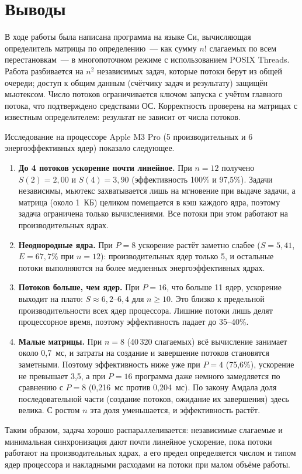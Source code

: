 \documentclass[pdf, unicode, 12pt, a4paper, oneside, fleqn]{article}
\begin{document}
\section{Выводы}

В ходе работы была написана программа на языке Си, вычисляющая определитель матрицы
по определению~--- как сумму $n!$ слагаемых по всем перестановкам~--- в многопоточном
режиме с использованием POSIX Threads. Работа разбивается на $n^2$ независимых задач,
которые потоки берут из общей очереди; доступ к общим данным (счётчику задач и результату)
защищён мьютексом. Число потоков ограничивается ключом запуска с учётом главного потока,
что подтверждено средствами ОС. Корректность проверена на матрицах с известным
определителем: результат не зависит от числа потоков.

Исследование на процессоре Apple M3 Pro (5 производительных и 6 энергоэффективных ядер)
показало следующее.

\begin{enumerate}
    \item \textbf{До 4 потоков ускорение почти линейное.} При $n = 12$ получено
          $S(2) = 2{,}00$ и $S(4) = 3{,}90$ (эффективность 100\% и 97,5\%). Задачи независимы,
          мьютекс захватывается лишь на мгновение при выдаче задачи, а матрица (около 1~КБ)
          целиком помещается в кэш каждого ядра, поэтому задача ограничена только
          вычислениями. Все потоки при этом работают на производительных ядрах.

    \item \textbf{Неоднородные ядра.} При $P = 8$ ускорение растёт заметно слабее
          ($S = 5{,}41$, $E = 67{,}7\%$ при $n = 12$): производительных ядер только 5,
          и остальные потоки выполняются на более медленных энергоэффективных ядрах.

    \item \textbf{Потоков больше, чем ядер.} При $P = 16$, что больше 11 ядер, ускорение
          выходит на плато: $S \approx 6{,}2$--$6{,}4$ для $n \ge 10$. Это близко к
          предельной производительности всех ядер процессора. Лишние потоки лишь делят
          процессорное время, поэтому эффективность падает до 35--40\%.

    \item \textbf{Малые матрицы.} При $n = 8$ (40\,320 слагаемых) всё вычисление занимает
          около 0,7~мс, и затраты на создание и завершение потоков становятся заметными.
          Поэтому эффективность ниже уже при $P = 4$ (75,6\%), ускорение не превышает 3,5,
          а при $P = 16$ программа даже немного замедляется по сравнению с $P = 8$
          (0,216~мс против 0,204~мс). По закону Амдала доля последовательной части
          (создание потоков, ожидание их завершения) здесь велика. С ростом $n$ эта доля
          уменьшается, и эффективность растёт.

\end{enumerate}

Таким образом, задача хорошо распараллеливается: независимые слагаемые и минимальная
синхронизация дают почти линейное ускорение, пока потоки работают на производительных
ядрах, а его предел определяется числом и типом ядер процессора и накладными расходами
на потоки при малом объёме работы.

\pagebreak
\end{document}

